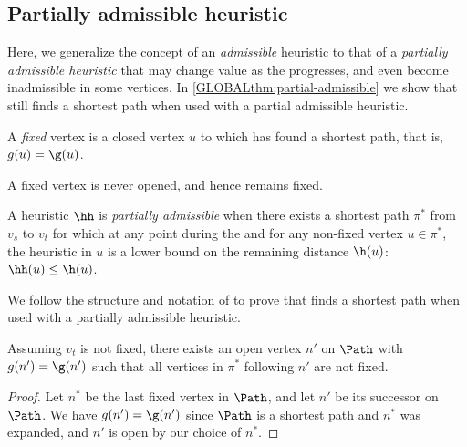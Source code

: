 \subsection{Partially admissible heuristic} \label{GLOBALsec:partial-admissible}

Here, we generalize the concept of an \emph{admissible} heuristic to that of a
\emph{partially admissible heuristic} that may change value as the \A
progresses, and even become inadmissible in some vertices.
In \cref{GLOBALthm:partial-admissible} we show that \A still finds a shortest path
when used with a partial admissible heuristic.

\begin{definition}
  A \emph{fixed} vertex is a closed vertex $u$ to which \A has found a shortest path,
  that is, $g(u) = \g(u)$.
\end{definition}
A fixed vertex is never opened, and hence remains fixed.

\begin{definition}
  A heuristic $\hh$ is \emph{partially admissible} when there exists a shortest
  path $\pi^*$ from  $v_s$ to $v_t$ for which at any point during the \A and for
  any non-fixed vertex $u\in \pi^*$, the heuristic in $u$ is a lower bound on
  the remaining distance $\h(u)$: $\hh(u) \leq \h(u)$.
\end{definition}

We follow the structure and notation of \citet{hart1968formal} to prove that \A
finds a shortest path when used with a partially admissible heuristic.
\begin{lem}\label{GLOBALlemma1}
  Assuming $v_t$ is not fixed,
  there exists an open vertex $n'$ on $\Path$ with $g(n') = \g(n')$ such that
  all vertices in $\pi^*$ following $n'$ are not fixed.
\end{lem}
\begin{proof}
  Let $n^*$ be the last fixed vertex in $\Path$, and let
  $n'$ be its successor on $\Path$. We have $g(n') = \g(n')$ since $\Path$ is a
  shortest path and $n^*$ was expanded, and $n'$ is open by our choice of $n^*$.
\end{proof}


